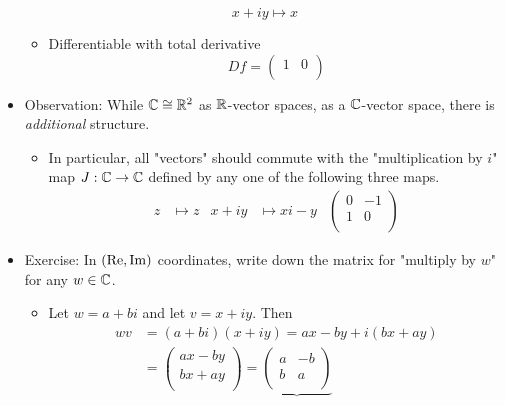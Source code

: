 \documentclass[../notes.tex]{subfiles}
\begin{document}
\begin{itemize}
    \begin{equation*}
        x+iy \mapsto x
    \end{equation*}
    \begin{itemize}
        \item Differentiable with total derivative
        \begin{equation*}
            Df =
            \begin{pmatrix}
                1 & 0\\
            \end{pmatrix}
        \end{equation*}
    \end{itemize}
    \item Observation: While $\mathbb{C}\cong\mathbb{R}^2$ as $\mathbb{R}$-vector spaces, as a $\mathbb{C}$-vector space, there is \emph{additional} structure.
    \begin{itemize}
        \item In particular, all "vectors" should commute with the "multiplication by $i$" map $J:\mathbb{C}\to\mathbb{C}$ defined by any one of the following three maps.
        \begin{align*}
            z &\mapsto z&
            x+iy &\mapsto xi-y&
            \begin{pmatrix}
                0 & -1\\
                1 & 0\\
            \end{pmatrix}
        \end{align*}
    \end{itemize}
    \item Exercise: In $(\operatorname{Re},\operatorname{Im})$ coordinates, write down the matrix for "multiply by $w$" for any $w\in\mathbb{C}$.
    \begin{itemize}
        \item Let $w=a+bi$ and let $v=x+iy$. Then
        \begin{align*}
            wv &= (a+bi)(x+iy)
                = ax-by+i(bx+ay)\\
            &=
            \begin{pmatrix}
                ax-by\\
                bx+ay\\
            \end{pmatrix}
                = \underbrace{
                    \begin{pmatrix}
                        a & -b\\
                        b & a\\

\end{pmatrix}}
\end{align*}
\end{itemize}
\end{itemize}
\end{document}
